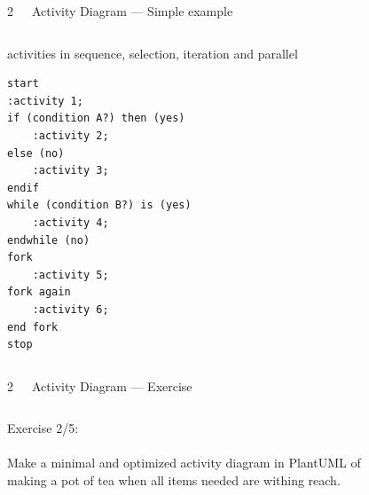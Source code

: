 \documentclass{beamer}
\begin{document}
\begin{frame}[fragile]{2~~~Activity Diagram — Simple example}
\begin{columns}
\begin{column}{.5\textwidth}
\alert{activities} in \alert{sequence}, \alert{selection}, \alert{iteration} and \alert{parallel}
{\scriptsize\begin{verbatim}
start
:activity 1;
if (condition A?) then (yes)
    :activity 2;
else (no)
    :activity 3;
endif
while (condition B?) is (yes)
    :activity 4;
endwhile (no)
fork
    :activity 5;
fork again
    :activity 6;
end fork
stop
\end{verbatim}}
\end{column}
\begin{column}{.5\textwidth}
\begin{figure}
\def\centering\svgwidth{\columnwidth}
\resizebox{!}{.65\textheight}{}
\end{figure}
\end{column}
\end{columns}
\end{frame}

\begin{frame}{2~~~Activity Diagram — Exercise}
\begin{columns}
\begin{column}{.35\textwidth}
Exercise 2/5:
\\\mbox{}\\
Make a minimal and optimized activity diagram in PlantUML of making a pot of tea when all items needed are withing reach.
\end{column}
\begin{column}{.65\textwidth}
\begin{figure}
\centering
{}
\end{figure}
\end{column}
\end{columns}
\end{frame}
\end{document}
